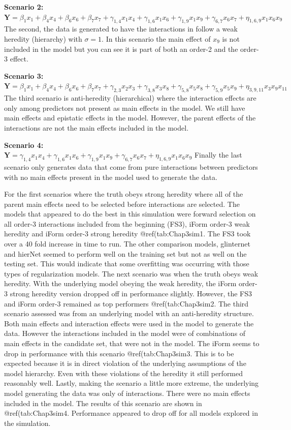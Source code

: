 \documentclass[11pt,]{book}
\theoremstyle{definition}
\theoremstyle{definition}
\theoremstyle{remark}
\begin{document}
\textbf{Scenario 2:}\\
\(\mathbf{Y}=\beta_1 x_1+\beta_4 x_4+\beta_6 x_6+\beta_7 x_7+\gamma_{1,4} x_1 x_4+\gamma_{1,6} x_1 x_6+\gamma_{1,9} x_1 x_9+\gamma_{6,7} x_6 x_7+\eta_{1,6,9} x_1 x_6 x_9\)
The second, the data is generated to have the interactions in follow a
weak heredity (hierarchy) with \(\sigma = 1\). In this scenario the main
effect of \(x_9\) is not included in the model but you can see it is
part of both an order-2 and the order-3 effect.

\textbf{Scenario 3:}\\
\(\mathbf{Y}=\beta_1 x_1+\beta_4 x_4+\beta_6 x_6+\beta_7 x_7+\gamma_{2,3} x_2 x_3+\gamma_{3,8} x_3 x_8+\gamma_{5,8} x_5 x_8+\gamma_{5,9} x_5 x_9+\eta_{3,9,11} x_3 x_9 x_11\)
The third scenario is anti-heredity (hierarchical) where the interaction
effects are only among predictors not present as main effects in the
model. We still have main effects and epistatic effects in the model.
However, the parent effects of the interactions are not the main effects
included in the model.

\textbf{Scenario 4:}\\
\(\mathbf{Y}=\gamma_{1,4} x_1 x_4+\gamma_{1,6} x_1 x_6+\gamma_{1,9} x_1 x_9+\gamma_{6,7} x_6 x_7+\eta_{1,6,9} x_1 x_6 x_9\)
Finally the last scenario only generates data that come from pure
interactions between predictors with no main effects present in the
model used to generate the data.

For the first scenarios where the truth obeys strong heredity where all
of the parent main effects need to be selected before interactions are
selected. The models that appeared to do the best in this simulation
were forward selection on all order-3 interactions included from the
beginning (FS3), iForm order-3 weak heredity and iForm order-3 strong
heredity @ref(tab:Chap3sim1. The FS3 took over a 40 fold increase in
time to run. The other comparison models, glinternet and hierNet seemed
to perform well on the training set but not as well on the testing set.
This would indicate that some overfitting was occurring with those types
of regularization models. The next scenario was when the truth obeys
weak heredity. With the underlying model obeying the weak heredity, the
iForm order-3 strong heredity version dropped off in performance
slightly. However, the FS3 and iForm order-3 remained as top performers
@ref(tab:Chap3sim2. The third scenario assessed was from an underlying
model with an anti-heredity structure. Both main effects and interaction
effects were used in the model to generate the data. However the
interactions included in the model were of combinations of main effects
in the candidate set, that were not in the model. The iForm seems to
drop in performance with this scenario @ref(tab:Chap3sim3. This is to be
expected because it is in direct violation of the underlying assumptions
of the model hierarchy. Even with these violations of the heredity it
still performed reasonably well. Lastly, making the scenario a little
more extreme, the underlying model generating the data was only of
interactions. There were no main effects included in the model. The
results of this scenario are shown in @ref(tab:Chap3sim4. Performance
appeared to drop off for all models explored in the simulation.
\end{document}
